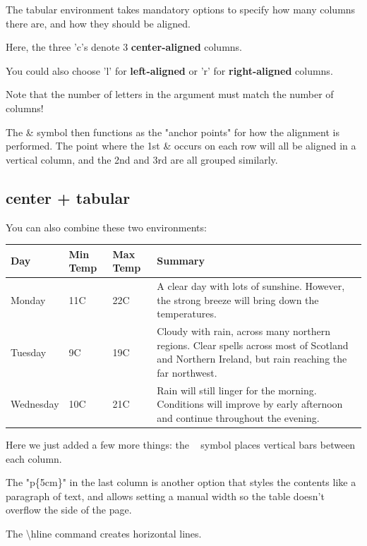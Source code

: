 \documentclass{article}
\begin{document}
The tabular environment takes mandatory options to specify how many columns there are, and how they should be aligned.

Here, the three 'c's denote 3 \textbf{center-aligned} columns. 

You could also choose 'l' for \textbf{left-aligned} or 'r' for \textbf{right-aligned} columns.

Note that the number of letters in the argument must match the number of columns!

The \& symbol then functions as the "anchor points" for how the alignment is performed. The point where the 1st \& occurs on each row will all be aligned in a vertical column, and the 2nd and 3rd are all grouped similarly.

\subsection{center + tabular}

You can also combine these two environments:

\begin{center}
    \begin{tabular}{| l | l | l | p{5cm} |}
    \hline
    Day & Min Temp & Max Temp & Summary \\ \hline
    Monday & 11C & 22C & A clear day with lots of sunshine.
    However, the strong breeze will bring down the temperatures. \\ \hline
    Tuesday & 9C & 19C & Cloudy with rain, across many northern regions. Clear spells 
    across most of Scotland and Northern Ireland, 
    but rain reaching the far northwest. \\ \hline
    Wednesday & 10C & 21C & Rain will still linger for the morning. 
    Conditions will improve by early afternoon and continue 
    throughout the evening. \\
    \hline
    \end{tabular}
\end{center}

Here we just added a few more things: the \textbar~ symbol places vertical bars between each column.

The "p\{5cm\}" in the last column is another option that styles the contents like a paragraph of text, and allows setting a manual width so the table doesn't overflow the side of the page.

The \textbackslash hline command creates horizontal lines. \\\\
\end{document}
